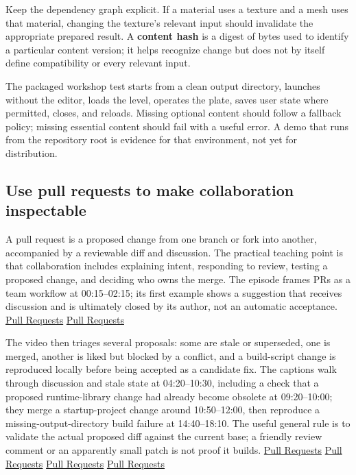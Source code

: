 Keep the dependency graph explicit. If a material uses a texture and a mesh uses that material, changing the texture's relevant input should invalidate the appropriate prepared result. A \textbf{content hash} is a digest of bytes used to identify a particular content version; it helps recognize change but does not by itself define compatibility or every relevant input.

The packaged workshop test starts from a clean output directory, launches without the editor, loads the level, operates the plate, saves user state where permitted, closes, and reloads. Missing optional content should follow a fallback policy; missing essential content should fail with a useful error. A demo that runs from the repository root is evidence for that environment, not yet for distribution.

\subsection{Use pull requests to make collaboration inspectable}\label{06-engine-ii-ch040-use-pull-requests-to-make-collaboration-inspectable}

A pull request is a proposed change from one branch or fork into another, accompanied by a reviewable diff and discussion. The practical teaching point is that collaboration includes explaining intent, responding to review, testing a proposed change, and deciding who owns the merge. The episode frames PRs as a team workflow at 00:15--02:15; its first example shows a suggestion that receives discussion and is ultimately closed by its author, not an automatic acceptance. \href{https://www.youtube.com/watch?v=h0OgLT6KJi8&t=15s}{Pull Requests} \href{https://www.youtube.com/watch?v=h0OgLT6KJi8&t=210s}{Pull Requests}

The video then triages several proposals: some are stale or superseded, one is merged, another is liked but blocked by a conflict, and a build-script change is reproduced locally before being accepted as a candidate fix. The captions walk through discussion and stale state at 04:20--10:30, including a check that a proposed runtime-library change had already become obsolete at 09:20--10:00; they merge a startup-project change around 10:50--12:00, then reproduce a missing-output-directory build failure at 14:40--18:10. The useful general rule is to validate the actual proposed diff against the current base; a friendly review comment or an apparently small patch is not proof it builds. \href{https://www.youtube.com/watch?v=h0OgLT6KJi8&t=260s}{Pull Requests} \href{https://www.youtube.com/watch?v=h0OgLT6KJi8&t=560s}{Pull Requests} \href{https://www.youtube.com/watch?v=h0OgLT6KJi8&t=650s}{Pull Requests} \href{https://www.youtube.com/watch?v=h0OgLT6KJi8&t=880s}{Pull Requests}

